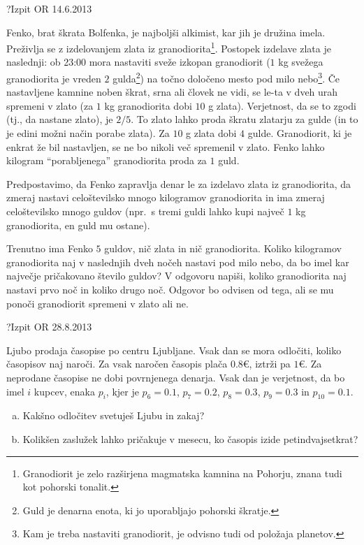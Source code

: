 \begin{naloga}{?}{Izpit OR 14.6.2013}
\begin{vprasanje}
Fenko, brat škrata Bolfenka, je najboljši alkimist, kar jih je družina imela.
Preživlja se z izdelovanjem zlata iz granodiorita\footnote{
Granodiorit je zelo razširjena magmatska kamnina na Pohorju,
znana tudi kot pohorski tonalit.
}.
Postopek izdelave zlata je naslednji:
ob 23:00 mora nastaviti sveže izkopan granodiorit
($1$ kg svežega granodiorita je vreden $2$ gulda\footnote{
Guld je denarna enota, ki jo uporabljajo pohorski škratje.
})
na točno določeno mesto pod milo nebo\footnote{
Kam je treba nastaviti granodiorit, je odvisno tudi od položaja planetov.
}.
Če nastavljene kamnine noben škrat, srna ali človek ne vidi,
se le-ta v dveh urah spremeni v zlato
(za $1$ kg granodiorita dobi $10$ g zlata).
Verjetnost, da se to zgodi (tj., da nastane zlato), je $2/5$.
To zlato lahko proda škratu zlatarju za gulde
(in to je edini možni način porabe zlata).
Za $10$ g zlata dobi $4$ gulde.
Granodiorit, ki je enkrat že bil nastavljen,
se ne bo nikoli več spremenil v zlato.
Fenko lahko kilogram ``porabljenega'' granodiorita proda za $1$ guld.

Predpostavimo, da Fenko zapravlja denar le za izdelavo zlata iz granodiorita,
da zmeraj nastavi celoštevilsko mnogo kilogramov granodiorita
in ima zmeraj celoštevilsko mnogo guldov
(npr.~s tremi guldi lahko kupi največ $1$ kg granodiorita, en guld mu ostane).

Trenutno ima Fenko $5$ guldov, nič zlata in nič granodiorita.
Koliko kilogramov granodiorita
naj v naslednjih dveh nočeh nastavi pod milo nebo,
da bo imel kar največje pričakovano število guldov?
V odgovoru napiši,
koliko granodiorita naj nastavi prvo noč in koliko drugo noč.
Odgovor bo odvisen od tega,
ali se mu ponoči granodiorit spremeni v zlato ali ne.
\end{vprasanje}
\begin{odgovor}
\end{odgovor}
\end{naloga}


\begin{naloga}{?}{Izpit OR 28.8.2013}
\begin{vprasanje}
Ljubo prodaja časopise po centru Ljubljane.
Vsak dan se mora odločiti, koliko časopisov naj naroči.
Za vsak naročen časopis plača $0.8 €$, iztrži pa $1 €$.
Za neprodane časopise ne dobi povrnjenega denarja.
Vsak dan je verjetnost, da bo imel $i$ kupcev, enaka $p_i$,
kjer je $p_6 = 0.1$, $p_7 = 0.2$, $p_8 = 0.3$, $p_9 = 0.3$ in $p_{10} = 0.1$.
\begin{enumerate}[(a)]
\item Kakšno odločitev svetuješ Ljubu in zakaj?
\item Kolikšen zaslužek lahko pričakuje v mesecu,
ko časopis izide petindvajsetkrat?
\end{enumerate}
\end{vprasanje}
\begin{odgovor}
\end{odgovor}
\end{naloga}


